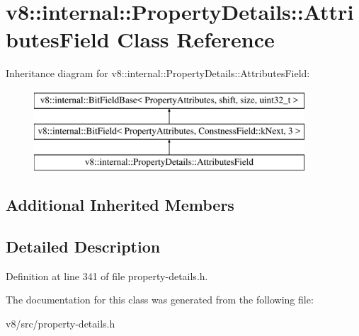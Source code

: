 \hypertarget{classv8_1_1internal_1_1PropertyDetails_1_1AttributesField}{}\section{v8\+:\+:internal\+:\+:Property\+Details\+:\+:Attributes\+Field Class Reference}
\label{classv8_1_1internal_1_1PropertyDetails_1_1AttributesField}
Inheritance diagram for v8\+:\+:internal\+:\+:Property\+Details\+:\+:Attributes\+Field\+:\begin{figure}[H]
\begin{center}
\leavevmode
\includegraphics[height=3.000000cm]{classv8_1_1internal_1_1PropertyDetails_1_1AttributesField}
\end{center}
\end{figure}
\subsection*{Additional Inherited Members}


\subsection{Detailed Description}


Definition at line 341 of file property-\/details.\+h.



The documentation for this class was generated from the following file\+:\begin{DoxyCompactItemize}
\item 
v8/src/property-\/details.\+h\end{DoxyCompactItemize}
